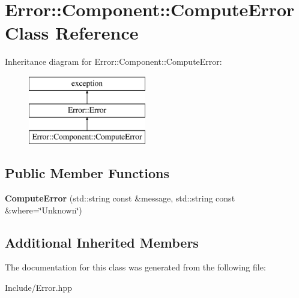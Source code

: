\hypertarget{classError_1_1Component_1_1ComputeError}{}\section{Error\+:\+:Component\+:\+:Compute\+Error Class Reference}
\label{classError_1_1Component_1_1ComputeError}
Inheritance diagram for Error\+:\+:Component\+:\+:Compute\+Error\+:\begin{figure}[H]
\begin{center}
\leavevmode
\includegraphics[height=3.000000cm]{classError_1_1Component_1_1ComputeError}
\end{center}
\end{figure}
\subsection*{Public Member Functions}
\begin{DoxyCompactItemize}
\item 
\mbox{\label{classError_1_1Component_1_1ComputeError_ad206f30d8d4466ed8547a44f9d13868f}} 
{\bfseries Compute\+Error} (std\+::string const \&message, std\+::string const \&where=\char`\"{}Unknown\char`\"{})
\end{DoxyCompactItemize}
\subsection*{Additional Inherited Members}


The documentation for this class was generated from the following file\+:\begin{DoxyCompactItemize}
\item 
Include/Error.\+hpp\end{DoxyCompactItemize}

